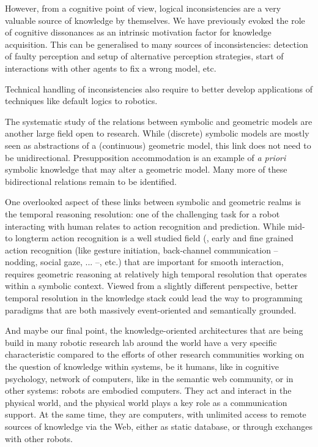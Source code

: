 However, from a cognitive point of view, logical inconsistencies are a very
valuable source of knowledge by themselves. We have previously evoked the role
of cognitive dissonances as an intrinsic motivation factor for knowledge
acquisition. This can be generalised to many sources of inconsistencies:
detection of faulty perception and setup of alternative perception strategies,
start of interactions with other agents to fix a wrong model, etc.

Technical handling of inconsistencies also require to better develop
applications of techniques like default logics to robotics.

\par

The systematic study of the relations between symbolic and geometric models are
another large field open to research. While (discrete) symbolic models are
mostly seen as abstractions of a (continuous) geometric model, this link does
not need to be unidirectional. Presupposition accommodation is an example of
{\it a priori} symbolic knowledge that may alter a geometric model. Many more
of these bidirectional relations remain to be identified.

One overlooked aspect of these links between symbolic and geometric realms is
the temporal reasoning resolution: one of the challenging task for a robot
interacting with human relates to action recognition and prediction. While mid-
to longterm action recognition is a well studied field (\cite{Ghallab1996,
Johnson2005, Tenorth2011}, early and fine grained action recognition (like
gesture initiation, back-channel communication -- nodding, social gaze, ... --,
etc.) that are important for smooth interaction, requires geometric reasoning
at relatively high temporal resolution that operates within a symbolic context.
Viewed from a slightly different perspective, better temporal resolution in the
knowledge stack could lead the way to programming paradigms that are both
massively event-oriented and semantically grounded.

\par

And maybe our final point, the knowledge-oriented architectures that are being
build in many robotic research lab around the world have a very specific
characteristic compared to the efforts of other research communities working on
the question of knowledge within systems, be it humans, like in cognitive
psychology, network of computers, like in the semantic web community, or in
other systems: robots are embodied computers. They act and interact in the
physical world, and the physical world plays a key role as a communication
support. At the same time, they are computers, with unlimited access to remote
sources of knowledge via the Web, either as static database, or through
exchanges with other robots.

